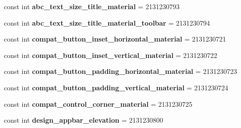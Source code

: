 \begin{DoxyCompactItemize}
\item 
\mbox{\label{classst_delivery_1_1_resource_1_1_dimension_a85d1786e6c4d97aed597ad2eeeb6897c}} 
const int {\bfseries abc\+\_\+text\+\_\+size\+\_\+title\+\_\+material} = 2131230793
\item 
\mbox{\label{classst_delivery_1_1_resource_1_1_dimension_ac7347fcda7f1c56965e2ae87a5bef749}} 
const int {\bfseries abc\+\_\+text\+\_\+size\+\_\+title\+\_\+material\+\_\+toolbar} = 2131230794
\item 
\mbox{\label{classst_delivery_1_1_resource_1_1_dimension_ae8e435cf20f2c62ebc095cd9fa92ed64}} 
const int {\bfseries compat\+\_\+button\+\_\+inset\+\_\+horizontal\+\_\+material} = 2131230721
\item 
\mbox{\label{classst_delivery_1_1_resource_1_1_dimension_aa334c2503547c9bc41ba8ec0ba5dcaee}} 
const int {\bfseries compat\+\_\+button\+\_\+inset\+\_\+vertical\+\_\+material} = 2131230722
\item 
\mbox{\label{classst_delivery_1_1_resource_1_1_dimension_a31b6f656391600e2d9aaa56a1dcef710}} 
const int {\bfseries compat\+\_\+button\+\_\+padding\+\_\+horizontal\+\_\+material} = 2131230723
\item 
\mbox{\label{classst_delivery_1_1_resource_1_1_dimension_afd6b9a836e2cbb02da0cbe59f4e5b9b4}} 
const int {\bfseries compat\+\_\+button\+\_\+padding\+\_\+vertical\+\_\+material} = 2131230724
\item 
\mbox{\label{classst_delivery_1_1_resource_1_1_dimension_ae11cf343e4967f281d1eec3958353419}} 
const int {\bfseries compat\+\_\+control\+\_\+corner\+\_\+material} = 2131230725
\item 
\mbox{\label{classst_delivery_1_1_resource_1_1_dimension_a1bff23d95f446c15a884e096c40386cd}} 
const int {\bfseries design\+\_\+appbar\+\_\+elevation} = 2131230800
\item 

\end{DoxyCompactItemize}
